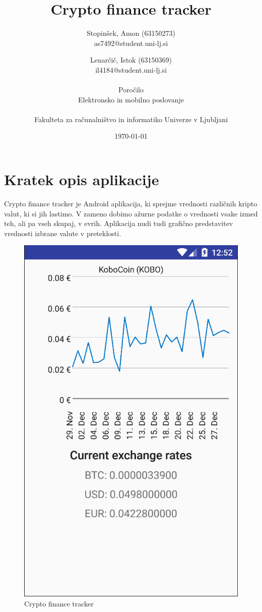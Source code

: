 \documentclass[11pt,a4paper]{article}
\title{Crypto finance tracker}
\author{
	Stopinšek, Amon (63150273)\\
	as7492@student.uni-lj.si\\
	\and
	Lenarčič, Istok (63150369)\\
	il4184@student.uni-lj.si\\
\ \\
Poročilo\\
Elektronsko in mobilno poslovanje \\
\\
Fakulteta za računalništvo in informatiko Univerze v Ljubljani
\date{\today}         
}
\begin{document}
\maketitle


\section{Kratek opis aplikacije}

Crypto finance tracker je Android aplikacija, ki sprejme vrednosti različnih kripto valut, ki si jih lastimo. V zameno dobimo ažurne podatke o vrednosti vsake izmed teh, ali pa vseh skupaj, v evrih. Aplikacija nudi tudi grafično predstavitev vrednosti izbrane valute v preteklosti.\\

\begin{figure}[htb]
	\begin{center}
		\includegraphics[width=0.8\columnwidth]{graph.png}
	\end{center}
	\caption{Crypto finance tracker}
	\label{fig:mockup}
\end{figure}
\end{document}
